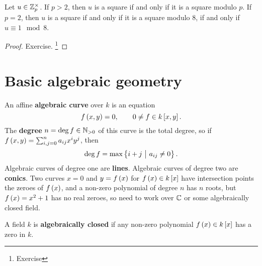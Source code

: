 \begin{corollary}
Let $ u \in \mathbb{Z}_p^\times $. If $ p > 2 $, then $ u $ is a square if and only if it is a square modulo $ p $. If $ p = 2 $, then $ u $ is a square if and only if it is a square modulo $ 8 $, if and only if $ u \equiv 1 \mod 8 $.
\end{corollary}

\begin{proof}
Exercise. \footnote{Exercise}
\end{proof}

\pagebreak

\section{Basic algebraic geometry}


An affine \textbf{algebraic curve} over $ k $ is an equation
$$ f\br{x, y} = 0, \qquad 0 \ne f \in k\sbr{x, y}. $$
The \textbf{degree} $ n = \deg f \in \mathbb{N}_{> 0} $ of this curve is the total degree, so if $ f\br{x, y} = \sum_{i, j = 0}^n a_{ij}x^iy^j $, then
$$ \deg f = \max\cbr{i + j \st a_{ij} \ne 0}. $$
Algebraic curves of degree one are \textbf{lines}. Algebraic curves of degree two are \textbf{conics}. Two curves $ x = 0 $ and $ y = f\br{x} $ for $ f\br{x} \in k\sbr{x} $ have intersection points the zeroes of $ f\br{x} $, and a non-zero polynomial of degree $ n $ has $ n $ roots, but $ f\br{x} = x^2 + 1 $ has no real zeroes, so need to work over $ \mathbb{C} $ or some algebraically closed field.

\begin{definition}
A field $ k $ is \textbf{algebraically closed} if any non-zero polynomial $ f\br{x} \in k\sbr{x} $ has a zero in $ k $.
\end{definition}


